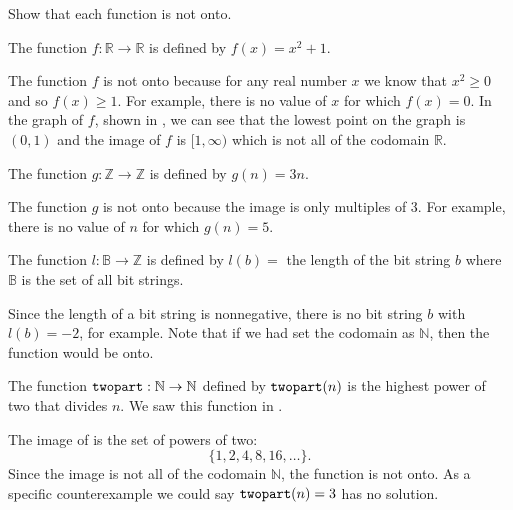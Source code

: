 \begin{exam}
\label{exam_not_onto}
    Show that each function is not onto.
    \begin{apart}
        \item The function $f:\mathbb{R} \to \mathbb{R}$ is defined by $f(x) = x^2+1$.
            \begin{soln}
                The function $f$ is not onto because for any real number $x$ we know that $x^2 \ge 0$ and so $f(x) \ge 1$. For example, there is no value of $x$ for which $f(x) = 0$.  In the graph of $f$, shown in , we can see that the lowest point on the graph is $(0,1)$ and the image of $f$ is $[1,\infty)$ which is not all of the codomain $\mathbb{R}$.  
            \end{soln}
        \item The function $g: \mathbb{Z} \to \mathbb{Z}$ is defined by $g(n) = 3n$.
            \begin{soln}
                The function $g$ is not onto because the image is only multiples of 3.  For example, there is no value of $n$ for which $g(n) = 5$.
            \end{soln}    
        \item The function $l:\mathbb{B} \to \mathbb{Z}$ is defined by $l(b) =$ the length of the bit string $b$ where $\mathbb{B}$ is the set of all bit strings. 
           \begin{soln}
               Since the length of a bit string is nonnegative, there is no bit string $b$ with $l(b) = -2$, for example.  Note that if we had set the codomain as $\mathbb{N}$, then the function would be onto.
           \end{soln}
        \item The function $\texttt{twopart}: \mathbb{N} \to \mathbb{N}$ defined by $\texttt{twopart}(n)$ is the highest power of two that divides $n$.  We saw this function in .
            \begin{soln}
                The image of  is the set of powers of two:
                    $$\{1,2,4,8,16,\ldots\}.$$
                Since the image is not all of the codomain $\mathbb{N}$, the function  is not onto.  As a specific counterexample we could say $\texttt{twopart}(n) = 3$ has no solution.
            \end{soln}
    \end{apart}
\end{exam} 

